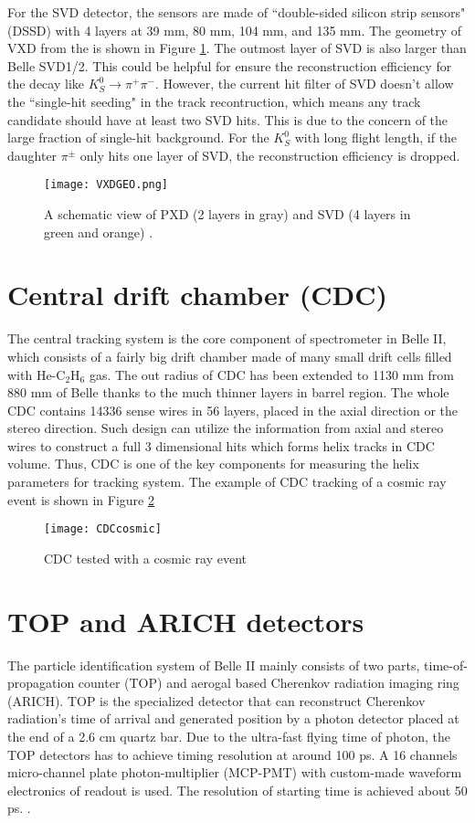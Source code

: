 For the SVD detector, the sensors are made of ``double-sided silicon strip sensors" (DSSD) with 4 layers at 39 mm, 80 mm, 104 mm, and 135 mm. The geometry of VXD from the is shown in Figure \ref{svd_geo}. The outmost layer of SVD is also larger than Belle SVD1/2. This could be helpful for ensure the reconstruction efficiency for the decay like $K_S^0 \to \pi^+ \pi^- $. However, the current hit filter of SVD doesn't allow the ``single-hit seeding" in the track recontruction, which means any track candidate should have at least two SVD hits. This is due to the concern of the large fraction of single-hit background. For the $K^0_S$ with long flight length, if the daughter $\pi^{\pm}$ only hits one layer of SVD, the reconstruction efficiency is dropped. 
\begin{figure}[H]
	\centering
	\texttt{[image: VXDGEO.png]}
	\caption{A schematic view of PXD (2 layers in gray) and SVD (4 layers in green and orange) \cite{Abe:2010gxa}.}
	\label{svd_geo}
\end{figure}



\section{Central drift chamber (CDC)}
The central tracking system is the core component of spectrometer in Belle II, which consists of a fairly big drift chamber made of many small drift cells filled with He-C$_2$H$_6$ gas. The out radius of CDC has been extended to 1130 mm from 880 mm of Belle thanks to the much thinner layers in barrel region. The whole CDC contains 14336 sense wires in 56 layers, placed in the axial direction or the stereo direction. Such design can utilize the information from axial and stereo wires to construct a full 3 dimensional hits which forms helix tracks in CDC volume. Thus, CDC is one of the key components for measuring the helix parameters for tracking system. The example of CDC tracking of a cosmic ray event  is shown in Figure \ref{CDC_cosmic}

\begin{figure}[H]
	\centering
	\texttt{[image: CDCcosmic]}
	\caption{CDC tested with a cosmic ray event \cite{b2book}}
	\label{CDC_cosmic}
\end{figure}


\section{TOP and ARICH detectors}
The particle identification system of Belle II mainly consists of two parts, time-of-propagation counter (TOP) and aerogal based Cherenkov radiation imaging ring (ARICH). TOP is the specialized detector that can reconstruct Cherenkov radiation's time of arrival and generated position by a photon detector placed at the end of a 2.6 cm quartz bar. Due to the ultra-fast flying time of photon, the TOP detectors has to achieve timing resolution at around 100 ps. A 16 channels micro-channel plate photon-multiplier (MCP-PMT) with custom-made waveform electronics of readout is used. The resolution of starting time is achieved about 50 ps. \cite{Abe:2010gxa}. 

